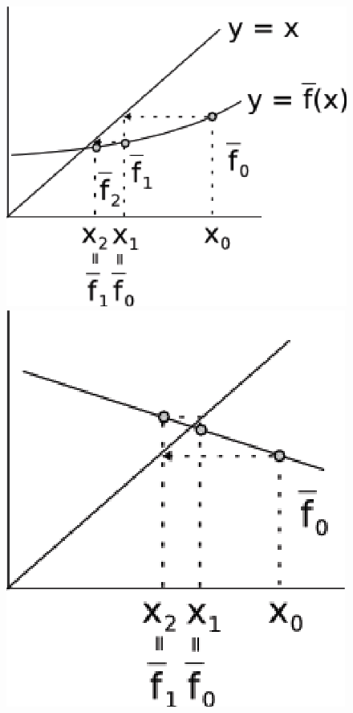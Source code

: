\begin{figure}[htb]
  \setlength{\abovecaptionskip}{20pt}
  \centering
  \includegraphics[scale=0.9]{capitulos/capitulo1/figuras/substituicoes1.eps}
  \includegraphics[scale=0.9]{capitulos/capitulo1/figuras/substituicoes2.eps}

\end{figure}

